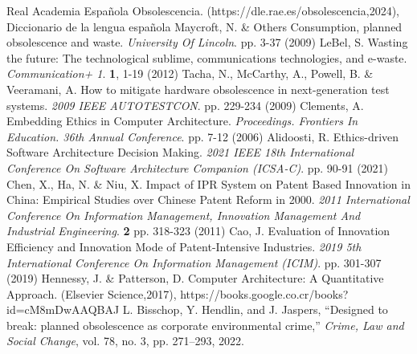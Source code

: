 \documentclass[10pt,journal,compsoc]{IEEEtran}
\begin{document}
%
%
%
\begin{thebibliography}{1}

Real Academia Española Obsolescencia. (https://dle.rae.es/obsolescencia,2024), Diccionario de la lengua española
Maycroft, N. \& Others Consumption, planned obsolescence and waste. {\em University Of Lincoln}. pp. 3-37 (2009)
LeBel, S. Wasting the future: The technological sublime, communications technologies, and e-waste. {\em Communication+ 1}. \textbf{1}, 1-19 (2012)
Tacha, N., McCarthy, A., Powell, B. \& Veeramani, A. How to mitigate hardware obsolescence in next-generation test systems. {\em 2009 IEEE AUTOTESTCON}. pp. 229-234 (2009)
Clements, A. Embedding Ethics in Computer Architecture. {\em Proceedings. Frontiers In Education. 36th Annual Conference}. pp. 7-12 (2006)
Alidoosti, R. Ethics-driven Software Architecture Decision Making. {\em 2021 IEEE 18th International Conference On Software Architecture Companion (ICSA-C)}. pp. 90-91 (2021)
Chen, X., Ha, N. \& Niu, X. Impact of IPR System on Patent Based Innovation in China: Empirical Studies over Chinese Patent Reform in 2000. {\em 2011 International Conference On Information Management, Innovation Management And Industrial Engineering}. \textbf{2} pp. 318-323 (2011)
Cao, J. Evaluation of Innovation Efficiency and Innovation Mode of Patent-Intensive Industries. {\em 2019 5th International Conference On Information Management (ICIM)}. pp. 301-307 (2019)
Hennessy, J. \& Patterson, D. Computer Architecture: A Quantitative Approach. (Elsevier Science,2017), https://books.google.co.cr/books?id=cM8mDwAAQBAJ
L. Bisschop, Y. Hendlin, and J. Jaspers, ``Designed to break: planned obsolescence as corporate environmental crime,'' \textit{Crime, Law and Social Change}, vol. 78, no. 3, pp. 271--293, 2022.

\end{thebibliography}
\end{document}
